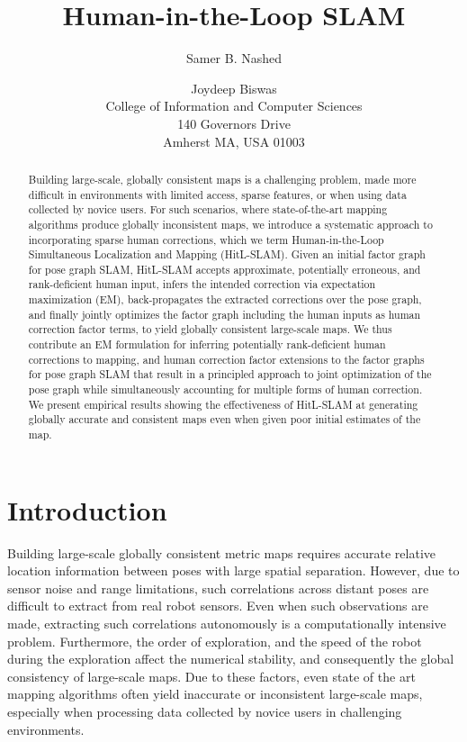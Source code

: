 \documentclass[letterpaper]{article} %
\title{Human-in-the-Loop SLAM}
\author{Samer B. Nashed \and Joydeep Biswas \\
College of Information and Computer Sciences\\
140 Governors Drive\\
Amherst MA, USA 01003
}
\theoremstyle{definition}
\begin{document}
\maketitle

\begin{abstract}
Building large-scale, globally consistent maps is a challenging problem, made more
difficult in environments with limited access, sparse
features, or when using data collected by novice users. For such scenarios,
where state-of-the-art mapping algorithms produce globally inconsistent maps, we
introduce a systematic approach to
incorporating sparse human corrections, which we term Human-in-the-Loop
Simultaneous Localization and Mapping (HitL-SLAM). Given an initial
factor graph for pose graph SLAM, HitL-SLAM accepts approximate, potentially
erroneous, and rank-deficient human input, infers the intended correction via
expectation maximization (EM), back-propagates the extracted corrections over
the pose graph, and finally jointly optimizes the factor graph including
the human inputs as human correction factor terms, to yield globally consistent large-scale maps.
We thus contribute an EM formulation for inferring potentially
rank-deficient human corrections to mapping, and human correction factor extensions to the
factor graphs for pose graph SLAM that result in a principled approach to joint
optimization of the pose graph while simultaneously accounting for multiple
forms of human correction. We present empirical results showing the
effectiveness of HitL-SLAM at generating globally accurate and consistent maps
even when given poor initial estimates of the map.
\end{abstract}

\section{Introduction}

Building large-scale globally consistent metric maps requires accurate relative
location information between poses with large spatial separation. However, due
to sensor noise and range limitations, such correlations across distant poses
are difficult to extract from real robot sensors. Even when such observations
are made, extracting such correlations autonomously is a computationally
intensive problem. Furthermore, the order of exploration, and the speed of the
robot during the exploration affect the numerical stability, and consequently
the global consistency of large-scale maps. Due to these factors, even state of
the art mapping algorithms often yield inaccurate or inconsistent large-scale
maps, especially when processing data collected by novice users in challenging
environments.
\end{document}
